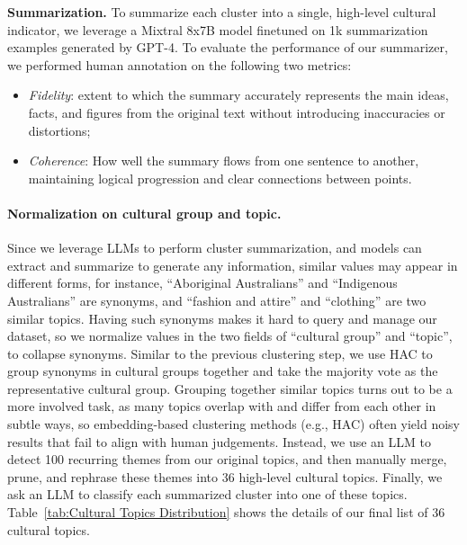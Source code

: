 \documentclass{article} %
\newcommand{\caleb}[1]{\textcolor{aqua}{[#1 --Caleb]}}
\newcommand{\ryan}[1]{\textcolor{magenta}{[#1 --Ryan]}}
\begin{document}
\noindent\textbf{Summarization.} To summarize each cluster into a single, high-level cultural indicator, we leverage a Mixtral 8x7B model finetuned on 1k summarization examples generated by GPT-4. To evaluate the performance of our summarizer, we performed human annotation on the following two metrics:
\begin{itemize}
    \item \textit{Fidelity}: extent to which the summary accurately represents the main ideas, facts, and figures from the original text without introducing inaccuracies or distortions; 
    \item \textit{Coherence}: How well the summary flows from one sentence to another, maintaining logical progression and clear connections between points.
\end{itemize}

\paragraph{Normalization on cultural group and topic.} 
Since we leverage LLMs to perform cluster summarization, and models can extract and summarize to generate any information, similar values may appear in different forms, for instance, ``Aboriginal Australians'' and ``Indigenous Australians'' are synonyms, %
and ``fashion and attire'' and ``clothing'' are two similar topics. Having such synonyms makes it hard to query and manage our dataset, so we normalize values in the two fields of ``cultural group'' and ``topic'', to collapse synonyms. Similar to the previous clustering step, we use HAC to group synonyms in cultural groups together and take the majority vote as the representative cultural group.
Grouping together similar topics turns out to be a more involved task, as many topics overlap with and differ from each other in subtle ways, so embedding-based clustering methods (e.g., HAC) often yield noisy results that fail to align with human judgements. Instead, we use an LLM to detect 100 recurring themes from our original topics, and then manually merge, prune, and rephrase these themes into 36 high-level cultural topics. Finally, we ask an LLM to classify each summarized cluster into one of these topics. Table~\ref{tab:Cultural Topics Distribution} shows the details of our final list of 36 cultural topics. 
\end{document}
